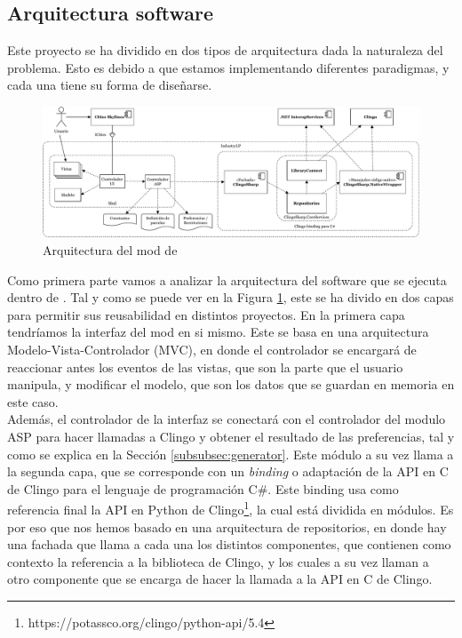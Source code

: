 \subsection{Arquitectura software}
\label{subsec:arquitectura}

Este proyecto se ha dividido en dos tipos de arquitectura dada la naturaleza del problema. Esto es debido a que estamos implementando diferentes paradigmas, y cada una tiene su forma de diseñarse. \\

\begin{figure}[!h]
	\centering
	\includegraphics[width=\textwidth]{images/arquitectura-mod}
	\caption{Arquitectura del mod de \cities}
	\label{fig:arquitectura-mod}
\end{figure}

Como primera parte vamos a analizar la arquitectura del software que se ejecuta dentro de \cities. Tal y como se puede ver en la Figura \ref{fig:arquitectura-mod}, este se ha divido en dos capas para permitir sus reusabilidad en distintos proyectos. En la primera capa tendríamos la interfaz del mod en si mismo. Este se basa en una arquitectura Modelo-Vista-Controlador (MVC), en donde el controlador se encargará de reaccionar antes los eventos de las vistas, que son la parte que el usuario manipula, y modificar el modelo, que son los datos que se guardan en memoria en este caso. \\

Además, el controlador de la interfaz se conectará con el controlador del modulo ASP para hacer llamadas a Clingo y obtener el resultado de las preferencias, tal y como se explica en la Sección \ref{subsubsec:generator}. Este módulo a su vez llama a la segunda capa, que se corresponde con un \textit{binding} o adaptación de la API en C de Clingo para el lenguaje de programación C\#. Este binding usa como referencia final la API en Python de Clingo\footnote{https://potassco.org/clingo/python-api/5.4}, la cual está dividida en módulos. Es por eso que nos hemos basado en una arquitectura de repositorios, en donde hay una fachada que llama a cada una los distintos componentes, que contienen como contexto la referencia a la biblioteca de Clingo, y los cuales a su vez llaman a otro componente que se encarga de hacer la llamada a la API en C de Clingo. \\


